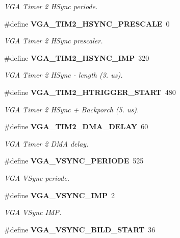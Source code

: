 \begin{DoxyCompactItemize}
\begin{DoxyCompactList}\small\item\em V\+GA Timer 2 H\+Sync periode. \end{DoxyCompactList}\item 
\#define {\bf V\+G\+A\+\_\+\+T\+I\+M2\+\_\+\+H\+S\+Y\+N\+C\+\_\+\+P\+R\+E\+S\+C\+A\+LE}~0\label{system_8h_ae0124ad9d53b4c2af5902820421aea02}

\begin{DoxyCompactList}\small\item\em V\+GA Timer 2 H\+Sync prescaler. \end{DoxyCompactList}\item 
\#define {\bf V\+G\+A\+\_\+\+T\+I\+M2\+\_\+\+H\+S\+Y\+N\+C\+\_\+\+I\+MP}~320\label{system_8h_ad3ef518a75a4d574f2a36ce343157676}

\begin{DoxyCompactList}\small\item\em V\+GA Timer 2 H\+Sync -\/ length (3. us). \end{DoxyCompactList}\item 
\#define {\bf V\+G\+A\+\_\+\+T\+I\+M2\+\_\+\+H\+T\+R\+I\+G\+G\+E\+R\+\_\+\+S\+T\+A\+RT}~480\label{system_8h_a5dabd74236cb9b42d94ccc7435176d40}

\begin{DoxyCompactList}\small\item\em V\+GA Timer 2 H\+Sync + Backporch (5. us). \end{DoxyCompactList}\item 
\#define {\bf V\+G\+A\+\_\+\+T\+I\+M2\+\_\+\+D\+M\+A\+\_\+\+D\+E\+L\+AY}~60\label{system_8h_ae0447f6b6430a8c09536288b2b01abb4}

\begin{DoxyCompactList}\small\item\em V\+GA Timer 2 D\+MA delay. \end{DoxyCompactList}\item 
\#define {\bf V\+G\+A\+\_\+\+V\+S\+Y\+N\+C\+\_\+\+P\+E\+R\+I\+O\+DE}~525\label{system_8h_a73e729af6a6a2eb20ef3804cf794e4bd}

\begin{DoxyCompactList}\small\item\em V\+GA V\+Sync periode. \end{DoxyCompactList}\item 
\#define {\bf V\+G\+A\+\_\+\+V\+S\+Y\+N\+C\+\_\+\+I\+MP}~2\label{system_8h_ad3c951f66600690235db2c93e74bc82f}

\begin{DoxyCompactList}\small\item\em V\+GA V\+Sync I\+MP. \end{DoxyCompactList}\item 
\#define {\bf V\+G\+A\+\_\+\+V\+S\+Y\+N\+C\+\_\+\+B\+I\+L\+D\+\_\+\+S\+T\+A\+RT}~36\label{system_8h_a1bf220647b6ad6187cc358cbffbb74fc}


\end{DoxyCompactItemize}
